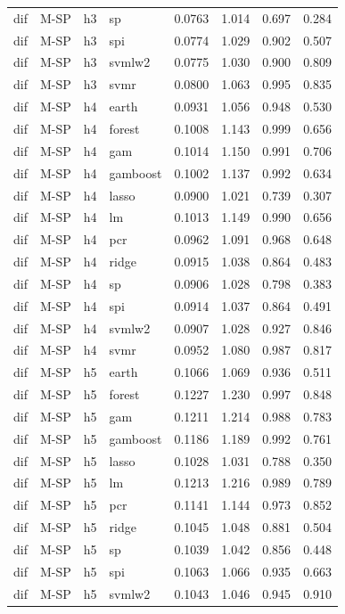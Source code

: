 \begin{ThreePartTable}
\begin{longtable}[t]{llclcccc}
dif & M-SP & h3 & sp & 0.0763 & 1.014 & 0.697 & 0.284\\
dif & M-SP & h3 & spi & 0.0774 & 1.029 & 0.902 & 0.507\\
dif & M-SP & h3 & svmlw2 & 0.0775 & 1.030 & 0.900 & 0.809\\
dif & M-SP & h3 & svmr & 0.0800 & 1.063 & 0.995 & 0.835\\
\addlinespace
dif & M-SP & h4 & earth & 0.0931 & 1.056 & 0.948 & 0.530\\
dif & M-SP & h4 & forest & 0.1008 & 1.143 & 0.999 & 0.656\\
dif & M-SP & h4 & gam & 0.1014 & 1.150 & 0.991 & 0.706\\
dif & M-SP & h4 & gamboost & 0.1002 & 1.137 & 0.992 & 0.634\\
dif & M-SP & h4 & lasso & 0.0900 & 1.021 & 0.739 & 0.307\\
dif & M-SP & h4 & lm & 0.1013 & 1.149 & 0.990 & 0.656\\
dif & M-SP & h4 & pcr & 0.0962 & 1.091 & 0.968 & 0.648\\
dif & M-SP & h4 & ridge & 0.0915 & 1.038 & 0.864 & 0.483\\
dif & M-SP & h4 & sp & 0.0906 & 1.028 & 0.798 & 0.383\\
dif & M-SP & h4 & spi & 0.0914 & 1.037 & 0.864 & 0.491\\
dif & M-SP & h4 & svmlw2 & 0.0907 & 1.028 & 0.927 & 0.846\\
dif & M-SP & h4 & svmr & 0.0952 & 1.080 & 0.987 & 0.817\\
\addlinespace
dif & M-SP & h5 & earth & 0.1066 & 1.069 & 0.936 & 0.511\\
dif & M-SP & h5 & forest & 0.1227 & 1.230 & 0.997 & 0.848\\
dif & M-SP & h5 & gam & 0.1211 & 1.214 & 0.988 & 0.783\\
dif & M-SP & h5 & gamboost & 0.1186 & 1.189 & 0.992 & 0.761\\
dif & M-SP & h5 & lasso & 0.1028 & 1.031 & 0.788 & 0.350\\
dif & M-SP & h5 & lm & 0.1213 & 1.216 & 0.989 & 0.789\\
dif & M-SP & h5 & pcr & 0.1141 & 1.144 & 0.973 & 0.852\\
dif & M-SP & h5 & ridge & 0.1045 & 1.048 & 0.881 & 0.504\\
dif & M-SP & h5 & sp & 0.1039 & 1.042 & 0.856 & 0.448\\
dif & M-SP & h5 & spi & 0.1063 & 1.066 & 0.935 & 0.663\\
dif & M-SP & h5 & svmlw2 & 0.1043 & 1.046 & 0.945 & 0.910\\

\end{longtable}
\end{ThreePartTable}
